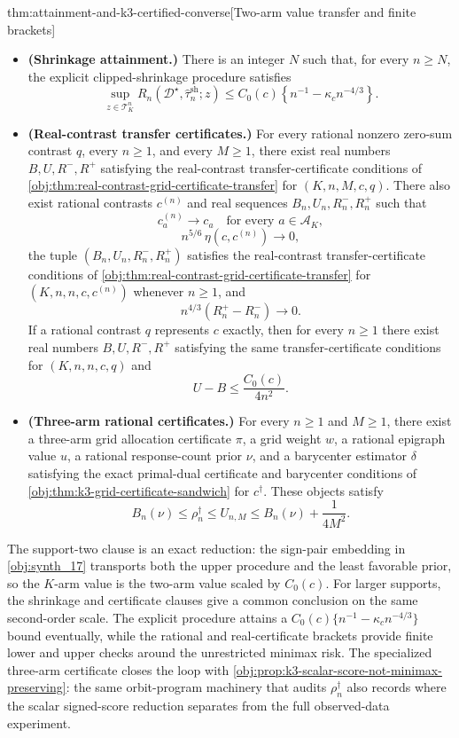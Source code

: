 \begin{theoremv}{thm:attainment-and-k3-certified-converse}[Two-arm value transfer and finite brackets]
\begin{itemize}
\item \textbf{(Shrinkage attainment.)} There is an integer \(N\) such that, for every \(n\ge N\), the explicit clipped-shrinkage procedure satisfies
\[
\sup_{z\in\mathcal T_K^n}
R_n(\mathcal D^\star,\widehat\tau_n^{\mathrm{sh}};z)
\le
C_0(c)\left\{n^{-1}-\kappa_c n^{-4/3}\right\}.
\]

\item \textbf{(Real-contrast transfer certificates.)} For every rational nonzero zero-sum contrast \(q\), every \(n\ge 1\), and every \(M\ge 1\), there exist real numbers \(B,U,R^-,R^+\) satisfying the real-contrast transfer-certificate conditions of \cref{obj:thm:real-contrast-grid-certificate-transfer} for \((K,n,M,c,q)\). There also exist rational contrasts \(c^{(n)}\) and real sequences \(B_n,U_n,R_n^-,R_n^+\) such that
\[
c^{(n)}_a\to c_a
\quad\text{for every }a\in\mathcal A_K,
\]
\[
n^{5/6}\,\eta(c,c^{(n)})\to 0,
\]
the tuple \((B_n,U_n,R_n^-,R_n^+)\) satisfies the real-contrast transfer-certificate conditions of \cref{obj:thm:real-contrast-grid-certificate-transfer} for \((K,n,n,c,c^{(n)})\) whenever \(n\ge 1\), and
\[
n^{4/3}(R_n^+-R_n^-)\to 0.
\]
If a rational contrast \(q\) represents \(c\) exactly, then for every \(n\ge 1\) there exist real numbers \(B,U,R^-,R^+\) satisfying the same transfer-certificate conditions for \((K,n,n,c,q)\) and
\[
U-B\le \frac{C_0(c)}{4n^2}.
\]

\item \textbf{(Three-arm rational certificates.)} For every \(n\ge 1\) and \(M\ge 1\), there exist a three-arm grid allocation certificate \(\pi\), a grid weight \(w\), a rational epigraph value \(u\), a rational response-count prior \(\nu\), and a barycenter estimator \(\delta\) satisfying the exact primal-dual certificate and barycenter conditions of \cref{obj:thm:k3-grid-certificate-sandwich} for \(c^\dagger\). These objects satisfy
\[
B_n(\nu)\le \rho_n^\dagger\le U_{n,M}
\le B_n(\nu)+\frac{1}{4M^2}.
\]
\end{itemize}
\end{theoremv}

The support-two clause is an exact reduction: the sign-pair embedding in \cref{obj:synth_17} transports both the upper procedure and the least favorable prior, so the \(K\)-arm value is the two-arm value scaled by \(C_0(c)\). For larger supports, the shrinkage and certificate clauses give a common conclusion on the same second-order scale. The explicit procedure attains a \(C_0(c)\{n^{-1}-\kappa_c n^{-4/3}\}\) bound eventually, while the rational and real-certificate brackets provide finite lower and upper checks around the unrestricted minimax risk. The specialized three-arm certificate closes the loop with \cref{obj:prop:k3-scalar-score-not-minimax-preserving}: the same orbit-program machinery that audits \(\rho_n^\dagger\) also records where the scalar signed-score reduction separates from the full observed-data experiment.
